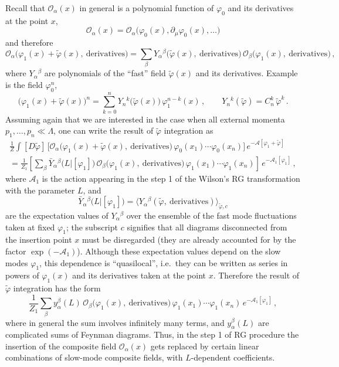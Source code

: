 Recall that $\mathcal O_\alpha(x)$ in general is a polynomial function of
$\varphi_0$ and its derivatives at the point $x$,
\[
\mathcal O_\alpha(x)=\mathcal O_\alpha\bigl(\varphi_0(x),\partial_\mu\varphi_0(x),\dots\bigr)
\]
and therefore
\[
\mathcal O_\alpha\bigl(\varphi_1(x)+\tilde\varphi(x),\ \text{derivatives}\bigr)=\sum_\beta Y_\alpha{}^\beta\bigl(\tilde\varphi(x),\ \text{derivatives}\bigr)\,\mathcal O_\beta\bigl(\varphi_1(x),\ \text{derivatives}\bigr)\,,
\]
where $Y_\alpha{}^\beta$ are polynomials of the ``fast'' field $\tilde\varphi(x)$ and
its derivatives. Example is the field $\varphi_0^n$,
\[
\bigl(\varphi_1(x)+\tilde\varphi(x)\bigr)^n=\sum_{k=0}^nY_n{}^k\bigl(\tilde\varphi(x)\bigr)\,\varphi_1^{n-k}(x)\,,\qquad Y_n{}^k(\tilde\varphi)=C_n^k\,\tilde\varphi^k\,.
\]
Assuming again that we are interested in the case when all external momenta
$p_1,\dots,p_n\ll\Lambda$, one can write the result of $\tilde\varphi$ integration
as
\begin{multline}\label{eq:Ostep1}
\frac1Z\int[D\tilde\varphi]\,\bigl[\mathcal O_\alpha\bigl(\varphi_1(x)+\tilde\varphi(x),\ \text{derivatives}\bigr)\,\varphi_0(x_1)\cdots\varphi_0(x_n)\bigr]\,e^{-\mathcal A[\varphi_1+\tilde\varphi]}\\
=\frac1{Z_1}\left[\sum_\beta\bar Y_\alpha{}^\beta\bigl(L|[\varphi_1]\bigr)\,\mathcal O_\beta\bigl(\varphi_1(x),\ \text{derivatives}\bigr)\,\varphi_1(x_1)\cdots\varphi_1(x_n)\right]\,e^{-\mathcal A_1[\varphi_1]}\,,
\end{multline}
where $\mathcal A_1$ is the action appearing in the step 1 of the Wilson's RG
transformation with the parameter $L$, and
\[
\bar Y_\alpha{}^\beta\bigl(L|[\varphi_1]\bigr)=\bigl\langle Y_\alpha{}^\beta(\tilde\varphi,\ \text{derivatives})\bigr\rangle_{\tilde\varphi,c}
\]
are the expectation values of $Y_\alpha{}^\beta$ over the ensemble of the fast mode
fluctuations taken at fixed $\varphi_1$; the subscript $c$ signifies that all
diagrams disconnected from the insertion point $x$ must be disregarded (they are
already accounted for by the factor $\exp(-\mathcal A_1)$). Although these
expectation values depend on the slow modes $\varphi_1$, this dependence is
``quasilocal'', i.e.\ they can be written as series in powers of $\varphi_1(x)$
and its derivatives taken at the point $x$. Therefore the result of
$\tilde\varphi$ integration has the form
\[
\frac1{Z_1}\sum_\beta y_\alpha^\beta(L)\,\mathcal O_\beta\bigl(\varphi_1(x),\ \text{derivatives}\bigr)\,\varphi_1(x_1)\cdots\varphi_1(x_n)\,e^{-\mathcal A_1[\varphi_1]}\,,
\]
where in general the sum involves infinitely many terms, and $y_\alpha^\beta(L)$
are complicated sums of Feynman diagrams. Thus, in the step 1 of RG procedure the
insertion of the composite field $\mathcal O_\alpha(x)$ gets replaced by certain
linear combinations of slow-mode composite fields, with $L$-dependent
coefficients.

